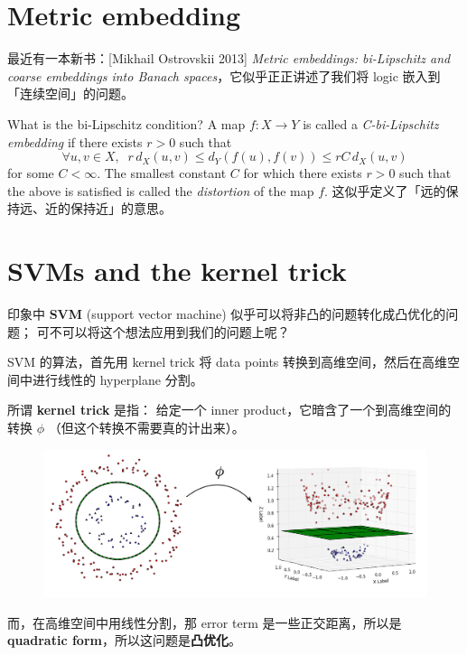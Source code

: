 \documentclass[12pt]{article}
\begin{document}
\section{Metric embedding}

最近有一本新书：[Mikhail Ostrovskii 2013] \textit{Metric embeddings: bi-Lipschitz and coarse embeddings into Banach spaces}\cite{Ostrovskii2013}，它似乎正正讲述了我们将 logic 嵌入到「连续空间」的问题。

What is the bi-Lipschitz condition?  A map $f: X \rightarrow Y$ is called a \textit{C-bi-Lipschitz embedding} if there exists $r > 0$ such that
$$ \forall u,v \in X, \;\; r\, d_X(u,v) \leq d_Y(f(u), f(v)) \leq r C\, d_X(u,v) $$
for some $C < \infty$.  The smallest constant $C$ for which there exists $r > 0$ such that the above is satisfied is called the \textit{distortion} of the map $f$.  这似乎定义了「远的保持远、近的保持近」的意思。

\section{SVMs and the kernel trick}

印象中 \textbf{SVM} (support vector machine) 似乎可以将非凸的问题转化成凸优化的问题； 可不可以将这个想法应用到我们的问题上呢？

SVM 的算法，首先用 kernel trick 将 data points 转换到高维空间，然后在高维空间中进行线性的 hyperplane 分割。

所谓 \textbf{kernel trick} 是指： 给定一个 inner product，它暗含了一个到高维空间的转换 $\phi$ （但这个转换不需要真的计出来）。


\begin{figure}[H]
\centering
\includegraphics[scale=0.6]{kernel-trick.png}
\end{figure}

而，在高维空间中用线性分割，那 error term 是一些正交距离，所以是 \textbf{quadratic form}，所以这问题是\textbf{凸优化}。
\end{document}
